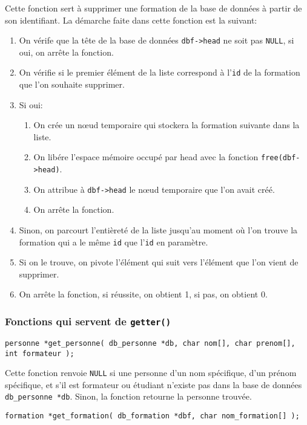 \documentclass[10pt]{article}
\begin{document}
Cette fonction sert à supprimer une formation de la base de données à partir de son identifiant. La démarche faite dans cette fonction est la suivant:
\begin{enumerate}
\item On vérife que la tête de la base de données \texttt{dbf->head} ne soit pas \texttt{NULL}, si oui, on arrête la fonction.
\item On vérifie si le premier élément de la liste correspond à l'\texttt{id} de la formation que l'on souhaite supprimer.
\item Si oui:
  \begin{enumerate}
  \item On crée un n\oe{}ud temporaire qui stockera la formation suivante dans la liste.
  \item On libére l'espace mémoire occupé par head avec la fonction \texttt{free(dbf->head)}.
  \item On attribue à \texttt{dbf->head} le n\oe{}ud temporaire que l'on avait créé.
  \item On arrête la fonction.
  \end{enumerate}
\item Sinon, on parcourt l'entièreté de la liste jusqu'au moment où l'on trouve la formation qui a le même \texttt{id} que l'\texttt{id} en paramètre.
\item Si on le trouve, on pivote l'élément qui suit vers l'élément que l'on vient de supprimer.
\item On arrête la fonction, si réussite, on obtient 1, si pas, on obtient 0.
\end{enumerate}

\subsubsection{Fonctions qui servent de \texttt{getter()}}

\begin{lstlisting}[firstnumber=275]
  personne *get_personne( db_personne *db, char nom[], char prenom[], int formateur );
\end{lstlisting}

Cette fonction renvoie \texttt{NULL} si une personne d'un nom spécifique, d'un prénom spécifique, et s'il est formateur ou étudiant n'existe pas dans la base de données \texttt{db\_personne *db}. Sinon, la fonction retourne la personne trouvée.

\begin{lstlisting}[firstnumber=532]
  formation *get_formation( db_formation *dbf, char nom_formation[] );
\end{lstlisting}
\end{document}
